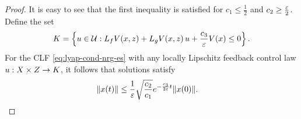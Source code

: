 \documentclass[twocolumn]{article}
\begin{document}
\begin{proof}
  It is easy to see that the first inequality is satisfied for $c_{1} \leq \frac{1}{2}$ and $c_{2} \geq \frac{\varepsilon}{2}$.
  Define the set
  \begin{align}
    K = \left\{ u \in \mathcal{U} : L_{f} V(x, z) + L_{g} V(x, z) \, u + \frac{c_{3}}{\varepsilon} V(x) \leq 0 \right\}.
    \label{eq:control-set}
  \end{align}
  For the CLF \eqref{eq:lyap-cond-nrg-es} with any locally Lipschitz feedback control law $u : X \times Z \to K$, it follows that solutions satisfy
  \begin{align*}
    \| x(t) \| \leq \frac{1}{\varepsilon} \sqrt{\frac{c_{2}}{c_{1}}} e^{-\frac{c_{3}}{2\varepsilon} t} \| x(0) \|. & \qedhere
  \end{align*}
  
\end{proof}
\end{document}
